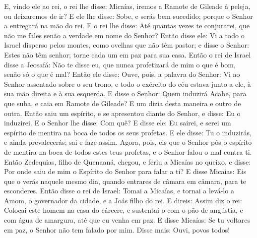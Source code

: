E, vindo ele ao rei, o rei lhe disse: Micaías, iremos a Ramote de
Gileade à peleja, ou deixaremos de ir? E ele lhe disse: Sobe, e
serás bem sucedido; porque o Senhor a entregará na mão do rei.
E o rei lhe disse: Até quantas vezes te conjurarei, que não
me fales senão a verdade em nome do Senhor? Então disse ele:
Vi a todo o Israel disperso pelos montes, como ovelhas que não têm
pastor; e disse o Senhor: Estes não têm senhor; torne cada um em paz
para sua casa. Então o rei de Israel disse a Jeosafá: Não te
disse eu, que nunca profetizará de mim o que é bom, senão só o que é
mal? Então ele disse: Ouve, pois, a palavra do Senhor: Vi ao
Senhor assentado sobre o seu trono, e todo o exército do céu estava
junto a ele, à sua mão direita e à sua esquerda. E disse o
Senhor: Quem induzirá Acabe, para que suba, e caia em Ramote de
Gileade? E um dizia desta maneira e outro de outra. Então
saiu um espírito, e se apresentou diante do Senhor, e disse: Eu o
induzirei. E o Senhor lhe disse: Com quê? E disse ele: Eu
sairei, e serei um espírito de mentira na boca de todos os seus
profetas. E ele disse: Tu o induzirás, e ainda prevalecerás; sai e
faze assim. Agora, pois, eis que o Senhor pôs o espírito de
mentira na boca de todos estes teus profetas, e o Senhor falou o mal
contra ti. Então Zedequias, filho de Quenaaná, chegou, e
feriu a Micaías no queixo, e disse: Por onde saiu de mim o Espírito
do Senhor para falar a ti? E disse Micaías: Eis que o verás
naquele mesmo dia, quando entrares de câmara em câmara, para te
esconderes. Então disse o rei de Israel: Tomai a Micaías, e
tornai a levá-lo a Amom, o governador da cidade, e a Joás filho do
rei. E direis: Assim diz o rei: Colocai este homem na casa do
cárcere, e sustentai-o com o pão de angústia, e com água de
amargura, até que eu venha em paz. E disse Micaías: Se tu
voltares em paz, o Senhor não tem falado por mim. Disse mais: Ouvi,
povos todos!


